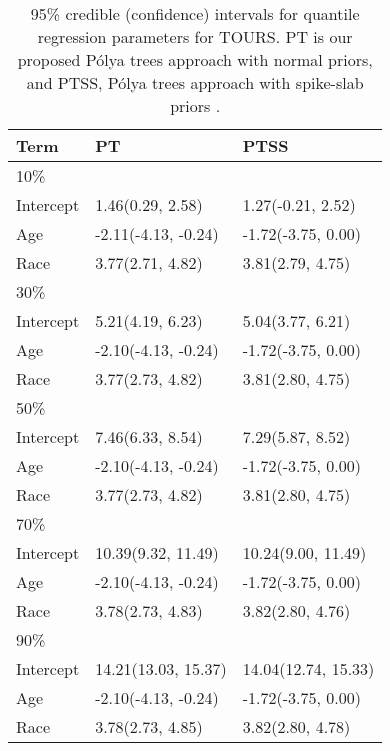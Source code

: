 \documentclass[12pt]{article}
\newcommand{\polya}{P\'{o}lya}
\begin{document}
\begin{table}[h]
  \caption[]{\label{ch2:tab:tours} 95\% credible (confidence) intervals for
    quantile regression parameters for TOURS.
    PT is our proposed \polya{} trees approach with normal priors, and PTSS,
    \polya{} trees approach with spike-slab priors .}
  \vspace{4mm}

  \centering
  \begin{tabular}[tb]{lll}
    \toprule
    Term      & PT                  & PTSS                \\
    \hline
    10\%      &                     &                     \\
    Intercept & 1.46(0.29, 2.58)    & 1.27(-0.21, 2.52)   \\
    Age       & -2.11(-4.13, -0.24) & -1.72(-3.75, 0.00)  \\
    Race      & 3.77(2.71, 4.82)    & 3.81(2.79, 4.75)    \\
    \hline
    30\%      &                     &                     \\
    Intercept & 5.21(4.19, 6.23)    & 5.04(3.77, 6.21)    \\
    Age       & -2.10(-4.13, -0.24) & -1.72(-3.75, 0.00)  \\
    Race      & 3.77(2.73, 4.82)    & 3.81(2.80, 4.75)    \\
    \hline
    50\%      &                     &                     \\
    Intercept & 7.46(6.33, 8.54)    & 7.29(5.87, 8.52)    \\
    Age       & -2.10(-4.13, -0.24) & -1.72(-3.75, 0.00)  \\
    Race      & 3.77(2.73, 4.82)    & 3.81(2.80, 4.75)    \\
    \hline
    70\%      &                     &                     \\
    Intercept & 10.39(9.32, 11.49)  & 10.24(9.00, 11.49)  \\
    Age       & -2.10(-4.13, -0.24) & -1.72(-3.75, 0.00)  \\
    Race      & 3.78(2.73, 4.83)    & 3.82(2.80, 4.76)    \\
    \hline
    90\%      &                     &                     \\
    Intercept & 14.21(13.03, 15.37) & 14.04(12.74, 15.33) \\
    Age       & -2.10(-4.13, -0.24) & -1.72(-3.75, 0.00)  \\
    Race      & 3.78(2.73, 4.85)    & 3.82(2.80, 4.78)    \\
    \bottomrule
  \end{tabular}
\end{table}
\end{document}
